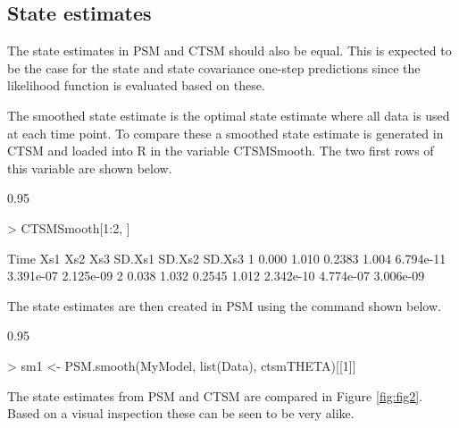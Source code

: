\documentclass{article}
\renewenvironment{Schunk}
{\begin{center} \begin{boxedminipage}{0.95\textwidth} }
{\end{boxedminipage}\end{center}}
\begin{document}
\newpage

\subsection{State estimates}

The state estimates in PSM and CTSM should also be equal. This is
expected to be the case for the state and state covariance one-step
predictions since the likelihood function is evaluated
based on these.

The smoothed state estimate is the optimal state estimate where all
data is used at each time point. To compare these a smoothed state
estimate is generated in CTSM and loaded into R in the variable
CTSMSmooth. The two first rows of this variable are shown below.


\begin{Schunk}
\begin{Sinput}
> CTSMSmooth[1:2, ]
\end{Sinput}
\begin{Soutput}
   Time   Xs1    Xs2   Xs3    SD.Xs1    SD.Xs2    SD.Xs3
1 0.000 1.010 0.2383 1.004 6.794e-11 3.391e-07 2.125e-09
2 0.038 1.032 0.2545 1.012 2.342e-10 4.774e-07 3.006e-09
\end{Soutput}
\end{Schunk}

The state estimates are then created in PSM using the command shown below.

\begin{Schunk}
\begin{Sinput}
> sm1 <- PSM.smooth(MyModel, list(Data), ctsmTHETA)[[1]]
\end{Sinput}
\end{Schunk}

The state estimates from PSM and CTSM are compared in Figure
\ref{fig:fig2}. Based on a visual inspection these can be seen to be
very alike. 
 
\end{document}
